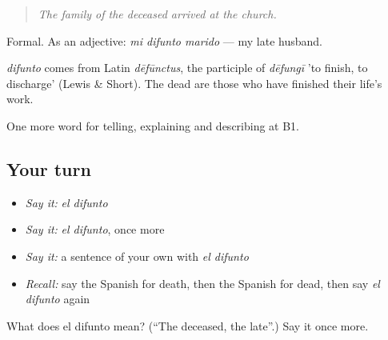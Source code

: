 \begin{quote}
\emph{The family of the deceased arrived at the church.}
\end{quote}

Formal. As an adjective: \emph{mi difunto marido} — my late husband.

\begin{cousinweb}
\emph{difunto} comes from Latin \emph{dēfūnctus}, the participle of \emph{dēfungī} 'to finish, to discharge' (Lewis \& Short). The dead are those who have finished their life's work.
\end{cousinweb}

\begin{grammarlens}[title={What you've built}]
One more word for telling, explaining and describing at B1.
\end{grammarlens}

\subsection*{Your turn}
\begin{itemize}
\raggedright
  \item \emph{Say it:} \emph{el difunto}
  \item \emph{Say it:} \emph{el difunto}, once more
  \item \emph{Say it:} a sentence of your own with \emph{el difunto}
  \item \emph{Recall:} say the Spanish for death, then the Spanish for dead, then say \emph{el difunto} again
\end{itemize}

\begin{tcolorbox}[breakable,colback=teal!4,colframe=teal!35!black,title={Before you move on}]
What does el difunto mean? (\textquotedblleft{}The deceased, the late\textquotedblright{}.) Say it once more.
\end{tcolorbox}
